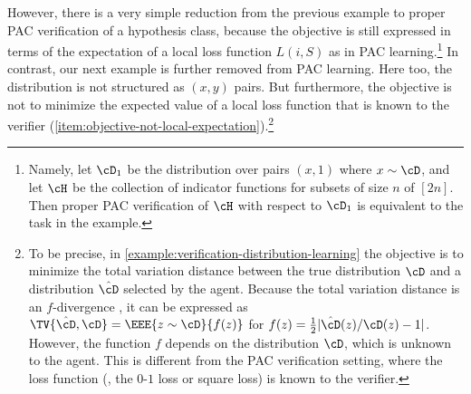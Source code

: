 However, there is a very simple reduction from the previous example to proper PAC verification of a hypothesis class, because the objective is still expressed in terms of the expectation of a local loss function $L(i,S)$ as in PAC learning.\footnote{
	Namely, let $\cD_1$ be the distribution over pairs $(x,1)$ where $x \sim \cD$, and let $\cH$ be the collection of indicator functions for subsets of size $n$ of $[2n]$. Then proper PAC verification of $\cH$ with respect to $\cD_1$ is equivalent to the task in the example.
}
In contrast, our next example is further removed from PAC learning. Here too, the distribution is not structured as $(x,y)$ pairs. But furthermore, the objective is not to minimize the expected value of a local loss function that is known to the verifier (\cref{item:objective-not-local-expectation}).\footnote{
	To be precise, in \cref{example:verification-distribution-learning} the objective is to minimize the total variation distance between the true distribution $\cD$ and a distribution $\hat{\cD}$ selected by the agent. Because the total variation distance is an $f$-divergence \cite{renyi1961measures}, it can be expressed as $\TV{\hat{\cD}, \cD} = \EEE{z \sim \cD}{f(z)}$ for $f(z) = \frac{1}{2}|\hat{\cD}(z)/\cD(z)-1|$. However, the function $f$ depends on the distribution $\cD$, which is unknown to the agent. This is different from the PAC verification setting, where the loss function (\eg, the $0$-$1$ loss or square loss) is known to the verifier.
} 



